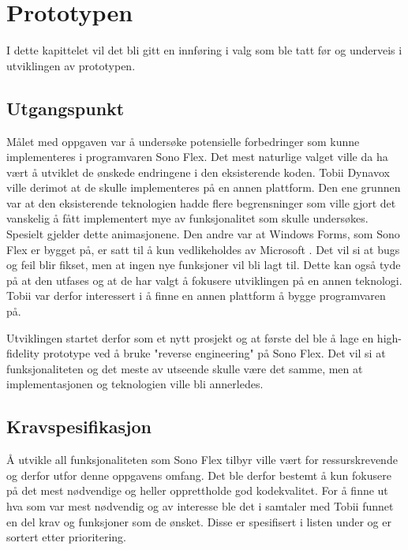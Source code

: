 \chapter{Prototypen} 

I dette kapittelet vil det bli gitt en innføring i valg som ble tatt før og underveis i utviklingen av prototypen. 
 
\section{Utgangspunkt} 
\label{sec:utgangspunkt} 

Målet med oppgaven var å undersøke potensielle forbedringer som kunne implementeres i programvaren Sono Flex. Det mest naturlige valget ville da  ha vært å utviklet de ønskede endringene i den eksisterende koden. Tobii Dynavox ville derimot at de skulle implementeres på en annen plattform. Den ene grunnen var at den eksisterende teknologien hadde flere begrensninger som ville gjort det vanskelig å fått implementert mye av funksjonalitet som skulle undersøkes. Spesielt gjelder dette animasjonene. Den andre var at Windows Forms, som Sono Flex er bygget på,  er satt til å  kun vedlikeholdes av Microsoft  \cite{AAAWPF8:online}.  Det vil si at bugs og feil blir fikset, men at ingen nye funksjoner vil bli lagt til. Dette kan også tyde på at den utfases og at de har valgt å fokusere utviklingen på en annen teknologi. Tobii var derfor interessert i å finne en annen plattform å bygge programvaren på.

Utviklingen startet derfor som et nytt prosjekt og at første del ble å lage en high-fidelity prototype ved å bruke "reverse engineering" på Sono Flex. Det vil si at funksjonaliteten og det meste av utseende skulle være det samme, men at implementasjonen og teknologien ville bli annerledes.


\section{Kravspesifikasjon} 


Å utvikle all funksjonaliteten som Sono Flex tilbyr ville vært for ressurskrevende og derfor utfor denne oppgavens omfang. Det ble derfor bestemt å kun fokusere på det mest nødvendige og heller opprettholde god kodekvalitet. For å finne ut hva som var mest nødvendig og av interesse ble det i samtaler med Tobii funnet en del krav og funksjoner som de ønsket. Disse er spesifisert i listen under og er sortert etter prioritering. 
 
